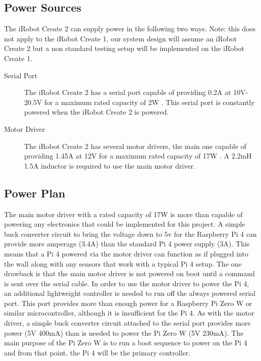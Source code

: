 \documentclass[12pt]{report}
\begin{document}
\subsection{Power Sources}
The iRobot Create 2 can supply power in the following two ways. Note: this does not apply to the iRobot Create 1, our system design will assume an iRobot Create 2 but a non standard testing setup will be implemented on the iRobot Create 1. 
\begin{description}
    \item[Serial Port] The iRobot Create 2 has a serial port capable of providing 0.2A at 10V-20.5V for a maximum rated capacity of 2W \cite{BatterySpecs}. This serial port is constantly powered when the iRobot Create 2 is powered. 
    \item[Motor Driver] The iRobot Create 2 has several motor drivers, the main one capable of providing 1.45A at 12V for a maximum rated capacity of 17W \cite{BatterySpecs}. A 2.2mH 1.5A inductor is required to use the main motor driver.
\end{description}

\subsection{Power Plan}
The main motor driver with a rated capacity of 17W is more than capable of powering any electronics that could be implemented for this project. A simple buck converter circuit to bring the voltage down to 5v for the Raspberry Pi 4 can provide more amperage (3.4A) than the standard Pi 4 power supply (3A). This means that a Pi 4 powered via the motor driver can function as if plugged into the wall along with any sensors that work with a typical Pi 4 setup. The one drawback is that the main motor driver is not powered on boot until a command is sent over the serial cable. In order to use the motor driver to power the Pi 4, an additional lightweight controller is needed to run off the always powered serial port. This port provides more than enough power for a Raspberry Pi Zero W or similar microcontroller, although it is insufficient for the Pi 4. As with the motor driver, a simple buck converter circuit attached to the serial port provides more power (5V 400mA) than is needed to power the Pi Zero W (5V 230mA). The main purpose of the Pi Zero W is to run a boot sequence to power on the Pi 4 and from that point, the Pi 4 will be the primary controller.

\end{document}
